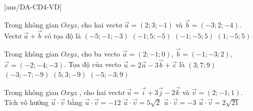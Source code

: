 \subsection{\vdmh}
[ans/DA-CD4-VD]
\begin{vd}[TN2024-102]%
    Trong không gian $Oxyz$, cho hai vectơ $\overrightarrow{a}=(2; 3;-1)$ và $\overrightarrow{b}=(-3; 2;-4)$. Vectơ $\overrightarrow{a}+\overrightarrow{b}$ có tọa độ là
    \choice
    {$(-5;-1;-3)$}
    {\True $(-1; 5;-5)$}
    {$(-1;-5; 5)$}
    {$(1;-5; 5)$}
\end{vd}
\begin{vd}%
    Trong không gian $Oxyz$, cho ba vecto $\overrightarrow{a}=(2;-1;0)$, $\overrightarrow{b}=(-1;-3;2)$, $\overrightarrow{c}=(-2;-4;-3)$. Tọa độ của vecto $\overrightarrow{u}=2\overrightarrow{a}-3\overrightarrow{b}+\overrightarrow{c}$ là
    \choice
    {$(3;7;9)$}
    {$(-3;-7;-9)$}
    {\True $(5;3;-9)$}
    {$(-5;-3;9)$}
\end{vd}
\begin{vd}%
    Trong không gian $Oxyz$ , cho hai vectơ $\overrightarrow {u}=\overrightarrow {i}+3\overrightarrow {j}-2\overrightarrow {k} $ và $\overrightarrow {v}=\left(2;-1;1\right)$. Tích vô hướng $\overrightarrow {u} \cdot \overrightarrow {v}$ bằng
    \choice
    {$\overrightarrow {u} \cdot \overrightarrow {v}=-12$}
    {$\overrightarrow {u} \cdot \overrightarrow {v}=5\sqrt 2 $}
    {\True $\overrightarrow {u} \cdot \overrightarrow {v}=-3$}
    {$\overrightarrow {u} \cdot \overrightarrow {v}=2\sqrt{21}$}
\end{vd}
